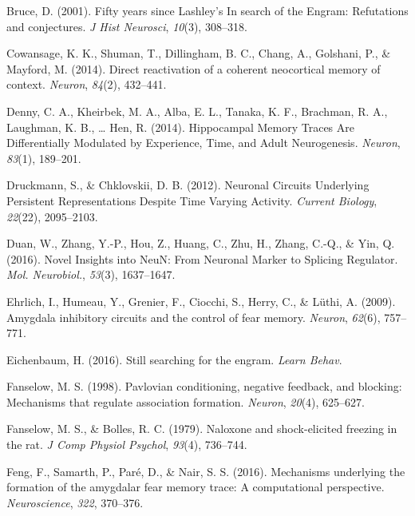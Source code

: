 \documentclass[12pt,a4paperpaper,]{report}
\begin{document}
\hypertarget{ref-bruceux5ffiftyux5f2001}{}
Bruce, D. (2001). Fifty years since Lashley's In search of the Engram:
Refutations and conjectures. \emph{J Hist Neurosci}, \emph{10}(3),
308--318.

\hypertarget{ref-cowansageux5fdirectux5f2014}{}
Cowansage, K. K., Shuman, T., Dillingham, B. C., Chang, A., Golshani,
P., \& Mayford, M. (2014). Direct reactivation of a coherent neocortical
memory of context. \emph{Neuron}, \emph{84}(2), 432--441.

\hypertarget{ref-dennyux5fhippocampalux5f2014}{}
Denny, C. A., Kheirbek, M. A., Alba, E. L., Tanaka, K. F., Brachman, R.
A., Laughman, K. B., \ldots{} Hen, R. (2014). Hippocampal Memory Traces
Are Differentially Modulated by Experience, Time, and Adult
Neurogenesis. \emph{Neuron}, \emph{83}(1), 189--201.

\hypertarget{ref-druckmannux5fneuronalux5f2012}{}
Druckmann, S., \& Chklovskii, D. B. (2012). Neuronal Circuits Underlying
Persistent Representations Despite Time Varying Activity. \emph{Current
Biology}, \emph{22}(22), 2095--2103.

\hypertarget{ref-duanux5fnovelux5f2016}{}
Duan, W., Zhang, Y.-P., Hou, Z., Huang, C., Zhu, H., Zhang, C.-Q., \&
Yin, Q. (2016). Novel Insights into NeuN: From Neuronal Marker to
Splicing Regulator. \emph{Mol. Neurobiol.}, \emph{53}(3), 1637--1647.

\hypertarget{ref-ehrlichux5famygdalaux5f2009}{}
Ehrlich, I., Humeau, Y., Grenier, F., Ciocchi, S., Herry, C., \& Lüthi,
A. (2009). Amygdala inhibitory circuits and the control of fear memory.
\emph{Neuron}, \emph{62}(6), 757--771.

\hypertarget{ref-eichenbaumux5fstillux5f2016}{}
Eichenbaum, H. (2016). Still searching for the engram. \emph{Learn
Behav}.

\hypertarget{ref-fanselowux5fpavlovianux5f1998}{}
Fanselow, M. S. (1998). Pavlovian conditioning, negative feedback, and
blocking: Mechanisms that regulate association formation. \emph{Neuron},
\emph{20}(4), 625--627.

\hypertarget{ref-fanselowux5fnaloxoneux5f1979}{}
Fanselow, M. S., \& Bolles, R. C. (1979). Naloxone and shock-elicited
freezing in the rat. \emph{J Comp Physiol Psychol}, \emph{93}(4),
736--744.

\hypertarget{ref-fengux5fmechanismsux5f2016}{}
Feng, F., Samarth, P., Paré, D., \& Nair, S. S. (2016). Mechanisms
underlying the formation of the amygdalar fear memory trace: A
computational perspective. \emph{Neuroscience}, \emph{322}, 370--376.
\end{document}
